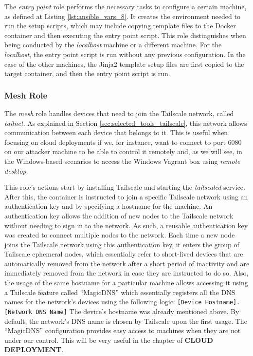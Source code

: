 The \textit{entry point} role performs the necessary tasks to configure a certain machine, as defined at Listing \ref{lst:ansible_vars_8}. It creates the environment needed to run the setup scripts, which may include copying template files to the Docker container and then executing the entry point script. This role distinguishes when being conducted by the \textit{localhost} machine or a different machine. For the \textit{localhost}, the entry point script is run without any previous configuration. In the case of the other machines, the Jinja2 template setup files are first copied to the target container, and then the entry point script is run.

\subsubsection{Mesh Role} \label{sec:ansible_mesh_role}

The \textit{mesh} role handles devices that need to join the Tailscale network, called \textit{tailnet}. As explained in Section \ref{sec:selected_tools_tailscale}, this network allows communication between each device that belongs to it. This is useful when focusing on cloud deployments if we, for instance, want to connect to port 6080 on our attacker machine to be able to control it remotely and, as we will see, in the Windows-based scenarios to access the Windows Vagrant box using \textit{remote desktop}. 

This role's actions start by installing Tailscale and starting the \textit{tailscaled} service. After this, the container is instructed to join a specific Tailscale network using an authentication key and by specifying a hostname for the machine. An authentication key allows the addition of new nodes to the Tailscale network without needing to sign in to the network. As such, a reusable authentication key was created to connect multiple nodes to the network. Each time a new node joins the Tailscale network using this authentication key, it enters the group of Tailscale ephemeral nodes, which essentially refer to short-lived devices that are automatically removed from the network after a short period of inactivity and are immediately removed from the network in case they are instructed to do so. Also, the usage of the same hostname for a particular machine allows accessing it using a Tailscale feature called ``MagicDNS'' which essentially registers all the DNS names for the network's devices using the following logic: \texttt{[Device Hostname].[Network DNS Name]}
The device's hostname was already mentioned above. By default, the network's DNS name is chosen by Tailscale upon the first usage. The ``MagicDNS'' configuration provides easy access to machines when they are not under our control. This will be very useful in the chapter of \textbf{CLOUD DEPLOYMENT}.